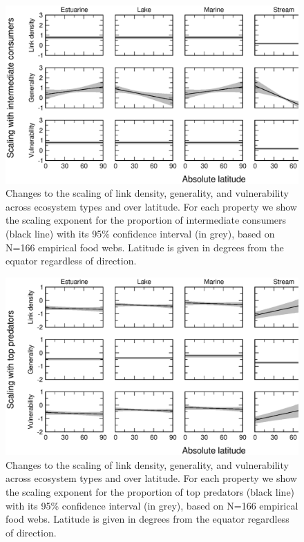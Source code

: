 \documentclass[12pt]{article}
\begin{document}
\newpage


\begin{figure}[h]
\centerline{\includegraphics*[width=.8\textwidth]{Figures/by_TL/marginal/I_marginal_latitude_proportions.eps}}
\caption{Changes to the scaling of link density, generality, and vulnerability across ecosystem
types and over latitude. For each property we show the scaling exponent for the proportion of
intermediate consumers (black line) with its 95\% confidence interval (in grey), based on 
N=166 empirical food webs. Latitude is given in degrees
from the equator regardless of direction.}
\label{I}
\end{figure}

\begin{figure}[!h]
\centerline{\includegraphics*[width=.8\textwidth]{Figures/by_TL/marginal/T_marginal_latitude_proportions.eps}}
\caption{Changes to the scaling of link density, generality, and vulnerability across ecosystem
types and over latitude. For each property we show the scaling exponent for the proportion of
top predators (black line) with its 95\% confidence interval (in grey), based on N=166 
empirical food webs. Latitude is given in degrees
from the equator regardless of direction.}
\label{T}
\end{figure}


\newpage


\end{document}

